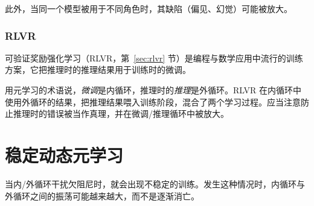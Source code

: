 此外，当同一个模型被用于不同角色时，其缺陷（偏见、幻觉）可能被放大。

\subsubsection{RLVR}
可验证奖励强化学习（RLVR，第~\ref{sec:rlvr} 节）是编程与数学应用中流行的训练方案，它把推理时的推理结果用于训练时的微调。

用元学习的术语说，{\em 微调}是内循环，推理时的{\em 推理}是外循环。RLVR 在内循环中使用外循环的结果，把推理结果喂入训练阶段，混合了两个学习过程。应当注意防止推理时的错误被当作真理，并在微调/推理循环中被放大。

    
\section{稳定动态元学习}
当内/外循环干扰欠阻尼时，就会出现不稳定的训练。发生这种情况时，内循环与外循环之间的振荡可能越来越大，而不是逐渐消亡。

